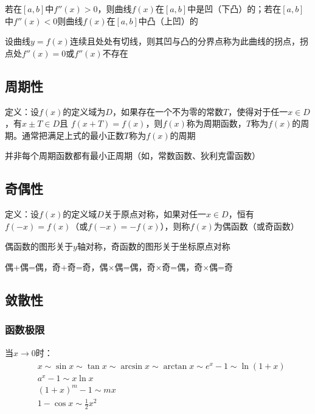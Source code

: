 \documentclass[12pt]{book}
\begin{document}
若在$[a,b]$中$ f''(x)> 0$，则曲线$f(x)$在$[a,b]$中是凹（下凸）的；若在$[a,b]$中$f''(x)<0$则曲线$f(x)$在$[a,b]$中凸（上凹）的

设曲线$y=f(x)$连续且处处有切线，则其凹与凸的分界点称为此曲线的拐点，拐点处$f''(x)=0$或$f''(x)$不存在

\subsection{周期性}

定义：设$f(x)$的定义域为$D$，如果存在一个不为零的常数$T$，使得对于任一$ x \in D$，有$x\pm T\in D$且 $f(x+T)= f(x)$，则$f(x)$称为周期函数，$T$称为$f(x)$的周期。通常把满足上式的最小正数$T$称为$f(x)$的周期


并非每个周期函数都有最小正周期（如，常数函数、狄利克雷函数）

\subsection{奇偶性}

定义：设$f(x)$的定义域$D$关于原点对称，如果对任一$x\in D$，恒有$f(-x)=f(x)$（或$ f(-x)=- f(x)$），则称$f(x)$为偶函数（或奇函数）


偶函数的图形关于$y$轴对称，奇函数的图形关于坐标原点对称

偶+偶=偶，奇+奇=奇，偶$\times$偶=偶，奇$\times$奇=偶，奇$\times$偶=奇



\subsection{敛散性}



\subsubsection{函数极限}

当$x\rightarrow 0$时：
\begin{gather*}
    \begin{aligned}
        & x\sim\sin{x}\sim\tan{x}\sim\arcsin{x}\sim\arctan{x}\sim e^{x}-1 \sim \ln(1+x)\\
        & a^{x}-1 \sim x\ln{x} \\
        & (1+x)^{m}-1 \sim mx  \\
        & 1-\cos{x}\sim \frac{1}{2}x^2
      \end{aligned}
\end{gather*}
\end{document}
